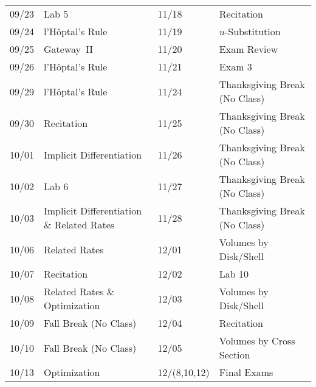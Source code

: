 \documentclass[11pt,letterpaper]{article}
\begin{document}
\begin{table}[!ht]
{\begin{tabular}{ll || ll}
	09/23 & Lab 5 & 11/18 & Recitation \\
	09/24 & l'H\^{o}ptal's Rule & 11/19 & $u$-Substitution \\
	09/25 & Gateway~II & 11/20 & Exam Review \\
	09/26 & l'H\^{o}ptal's Rule & 11/21 & Exam 3 \\
	09/29 & l'H\^{o}ptal's Rule & 11/24 & Thanksgiving Break (No Class) \\
	09/30 & Recitation & 11/25 & Thanksgiving Break (No Class) \\
	10/01 & Implicit Differentiation & 11/26 & Thanksgiving Break (No Class) \\
	10/02 & Lab 6 & 11/27 & Thanksgiving Break (No Class) \\
	10/03 & Implicit Differentiation \& Related Rates & 11/28 & Thanksgiving Break (No Class) \\
	10/06 & Related Rates & 12/01 & Volumes by Disk/Shell \\
	10/07 & Recitation & 12/02 & Lab 10 \\
	10/08 & Related Rates \& Optimization & 12/03 & Volumes by Disk/Shell \\
	10/09 & Fall Break (No Class) & 12/04 & Recitation \\
	10/10 & Fall Break (No Class) & 12/05 & Volumes by Cross Section \\
	10/13 & Optimization & 12/(8,10,12) & Final Exams
        \end{tabular}
        }
        \end{table}
\end{document}
